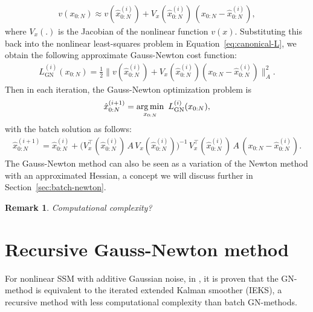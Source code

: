 \documentclass[dissertation,math,vertlayout,pdfa,colorlinks,nologo]{aaltoseries}
\newtheorem{remark}{Remark}
\begin{document}
\begin{equation} \label{eq:linear-rx}
    \begin{split}
        v(x_{0:N}) \approx v(\hat{x}^{(i)}_{0:N}) + V_x(\hat{x}^{(i)}_{0:N}) \, (x_{0:N} - \hat{x}^{(i)}_{0:N}),
    \end{split}
\end{equation}
where $V_x(.)$ is the Jacobian of the nonlinear function $v(x)$. Substituting this back into the nonlinear least-squares problem in Equation~\eqref{eq:canonical-L}, we obtain the following approximate Gauss-Newton cost function:
\begin{equation}
    \begin{split}
    L_{\text{GN}}^{(i)}(x_{0:N}) = \frac{1}{2} \lVert v(\hat{x}^{(i)}_{0:N}) + V_x(\hat{x}^{(i)}_{0:N}) (x_{0:N} - \hat{x}^{(i)}_{0:N}) \rVert^{2}_{A}.
    \end{split}
\end{equation}
Then in each iteration, the Gauss-Newton optimization problem is
\begin{equation} \label{eq:GN-opt}
    \hat{x}^{(i + 1)}_{0:N} = \operatorname*{arg\,min}_{x_{0:N}}{\, \, L_{\text{GN}}^{(i)}(x_{0:N}) },
\end{equation}
with the batch solution as follows:
\begin{equation}
    \begin{split}
        \hat{x}^{(i + 1)}_{0:N} = \hat{x}^{(i)}_{0:N} +  \big(V_x^\top(\hat{x}^{(i)}_{0:N}) \, A \, V_x(\hat{x}^{(i)}_{0:N})\big)^{-1} \, V_x^\top(\hat{x}^{(i)}_{0:N}) \,  A \, (x_{0:N} - \hat{x}^{(i)}_{0:N}).
    \end{split}
\end{equation}
The Gauss-Newton method can also be seen as a variation of the Newton method with an approximated Hessian, a concept we will discuss further in Section~\ref{sec:batch-newton}.
\begin{remark}
    Computational complexity?
\end{remark}

\section{Recursive Gauss-Newton method}
For nonlinear SSM with additive Gaussian noise, in \citep{bell1994iterated}, it is proven that the GN-method is equivalent to the iterated extended Kalman smoother (IEKS), a recursive method with less computational complexity than batch GN-methods.
\end{document}
